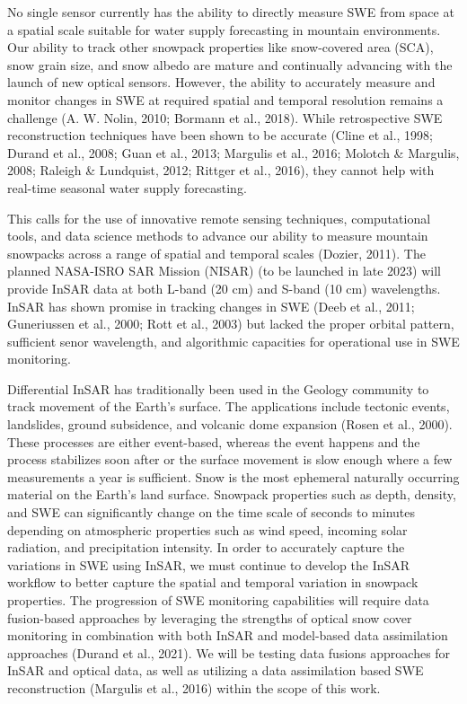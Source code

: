 No single sensor currently has the ability to directly measure SWE from space at a spatial scale suitable for water supply forecasting in mountain environments. Our ability to track other snowpack properties like snow-covered area (SCA), snow grain size, and snow albedo are mature and continually advancing with the launch of new optical sensors. However, the ability to accurately measure and monitor changes in SWE at required spatial and temporal resolution remains a challenge (A. W. Nolin, 2010; Bormann et al., 2018). While retrospective SWE reconstruction techniques have been shown to be accurate (Cline et al., 1998; Durand et al., 2008; Guan et al., 2013; Margulis et al., 2016; Molotch \& Margulis, 2008; Raleigh \& Lundquist, 2012; Rittger et al., 2016), they cannot help with real-time seasonal water supply forecasting. \par

This calls for the use of innovative remote sensing techniques, computational tools, and data science methods to advance our ability to measure mountain snowpacks across a range of spatial and temporal scales (Dozier, 2011). The planned NASA-ISRO SAR Mission (NISAR) (to be launched in late 2023) will provide InSAR data at both L-band (20 cm) and S-band (10 cm) wavelengths. InSAR has shown promise in tracking changes in SWE (Deeb et al., 2011; Guneriussen et al., 2000; Rott et al., 2003) but lacked the proper orbital pattern, sufficient senor wavelength, and algorithmic capacities for operational use in SWE monitoring. \par

Differential InSAR has traditionally been used in the Geology community to track movement of the Earth’s surface. The applications include tectonic events, landslides, ground subsidence, and volcanic dome expansion (Rosen et al., 2000). These processes are either event-based, whereas the event happens and the process stabilizes soon after or the surface movement is slow enough where a few measurements a year is sufficient.
Snow is the most ephemeral naturally occurring material on the Earth’s land surface. Snowpack properties such as depth, density, and SWE can significantly change on the time scale of seconds to minutes depending on atmospheric properties such as wind speed, incoming solar radiation, and precipitation intensity. In order to accurately capture the variations in SWE using InSAR, we must continue to develop the InSAR workflow to better capture the spatial and temporal variation in snowpack properties.
The progression of SWE monitoring capabilities will require data fusion-based approaches by leveraging the strengths of optical snow cover monitoring in combination with both InSAR and model-based data assimilation approaches (Durand et al., 2021). We will be testing data fusions approaches for InSAR and optical data, as well as utilizing a data assimilation based SWE reconstruction (Margulis et al., 2016) within the scope of this work.




